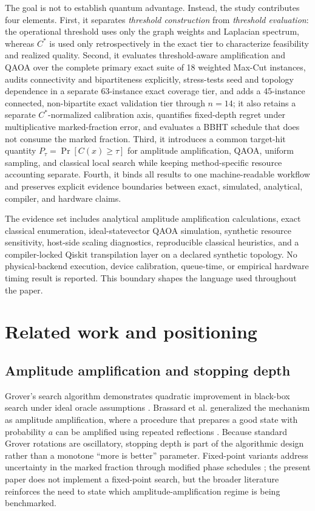 \documentclass[5p,times]{elsarticle}
\begin{document}
The goal is not to establish quantum advantage. Instead, the study contributes four elements. First, it separates \emph{threshold construction} from \emph{threshold evaluation}: the operational threshold uses only the graph weights and Laplacian spectrum, whereas $C^*$ is used only retrospectively in the exact tier to characterize feasibility and realized quality. Second, it evaluates threshold-aware amplification and QAOA over the complete primary exact suite of 18 weighted Max-Cut instances, audits connectivity and bipartiteness explicitly, stress-tests seed and topology dependence in a separate 63-instance exact coverage tier, and adds a 45-instance connected, non-bipartite exact validation tier through $n=14$; it also retains a separate $C^*$-normalized calibration axis, quantifies fixed-depth regret under multiplicative marked-fraction error, and evaluates a BBHT schedule that does not consume the marked fraction. Third, it introduces a common target-hit quantity $P_\tau=\Pr[C(x)\geq\tau]$ for amplitude amplification, QAOA, uniform sampling, and classical local search while keeping method-specific resource accounting separate. Fourth, it binds all results to one machine-readable workflow and preserves explicit evidence boundaries between exact, simulated, analytical, compiler, and hardware claims.

The evidence set includes analytical amplitude amplification calculations, exact classical enumeration, ideal-statevector QAOA simulation, synthetic resource sensitivity, host-side scaling diagnostics, reproducible classical heuristics, and a compiler-locked Qiskit transpilation layer on a declared synthetic topology. No physical-backend execution, device calibration, queue-time, or empirical hardware timing result is reported. This boundary shapes the language used throughout the paper.

\section{Related work and positioning}
\subsection{Amplitude amplification and stopping depth}
Grover's search algorithm demonstrates quadratic improvement in black-box search under ideal oracle assumptions \cite{grover1996}. Brassard et al. generalized the mechanism as amplitude amplification, where a procedure that prepares a good state with probability $a$ can be amplified using repeated reflections \cite{brassard2002}. Because standard Grover rotations are oscillatory, stopping depth is part of the algorithmic design rather than a monotone ``more is better'' parameter. Fixed-point variants address uncertainty in the marked fraction through modified phase schedules \cite{yoder2014}; the present paper does not implement a fixed-point search, but the broader literature reinforces the need to state which amplitude-amplification regime is being benchmarked.
\end{document}

